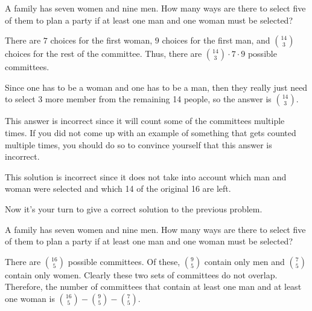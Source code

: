 \begin{eval}
A family has seven women and nine men.
How many ways are there to select five of them to plan a party 
if at least one man and one woman must be selected?
\begin{ssolenum}
\item
There are $7$ choices for the first woman, $9$ choices for the first man, and
$\binom{14}{3}$ choices for the rest of the committee.  Thus, there are
$\binom{14}{3}\cdot 7 \cdot 9$ possible committees.

\noindent
\evallinetwo
\item
Since one has to be a woman and one has to be a man, then they really just need to select
3 more member from the remaining 14 people, so the answer is $\binom{14}{3}$.

\noindent
\evallinetwo
\end{ssolenum}
\begin{answer}
\begin{solevalenum}
\item
This answer is incorrect since it will count some of the committees multiple times.  
If you did not come up with an example of something that gets counted multiple times,
you should do so to convince yourself that this answer is incorrect.
\item
This solution is incorrect since it does not take into account which man and woman 
were selected  and which 14 of the original 16 are left.
\end{solevalenum}
\end{answer}
\end{eval}

Now it's your turn to give a correct solution to the previous problem.
\begin{exer}
A family has seven women and nine men.
How many ways are there to select five of them to plan a party 
if at least one man and one woman must be selected?

\vspace*{1.1in}

\begin{answer}
There are $\binom{16}{5}$ possible committees.  Of these, $\binom{9}{5}$  contain only men and 
$\binom{7}{5}$ contain only women.  
Clearly these two sets of committees do not overlap.
Therefore, the number of committees that contain at least one man and at least one woman is
$\binom{16}{5}-\binom{9}{5} -\binom{7}{5}$.
\end{answer}
\end{exer}

